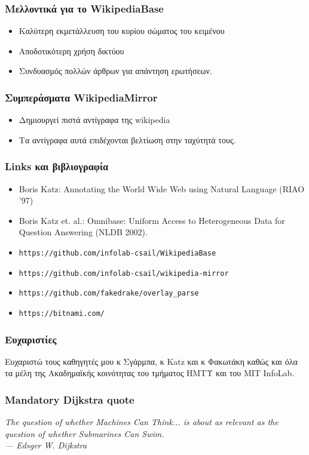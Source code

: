 \documentclass[bigger]{beamer}
\begin{document}
\begin{frame}
  \frametitle{Μελλοντικά για το WikipediaBase}
  \begin{itemize}
  \item Καλύτερη εκμετάλλευση του κυρίου σώματος του κειμένου
  \item Αποδοτικότερη χρήση δικτύου
  \item Συνδυασμός πολλών άρθρων για απάντηση ερωτήσεων.
  \end{itemize}
\end{frame}

\begin{frame}
  \frametitle{Συμπεράσματα WikipediaMirror}

  \begin{itemize}
  \item Δημιουργεί πιστά αντίγραφα της wikipedia
  \item Τα αντίγραφα αυτά επιδέχονται βελτίωση στην ταχύτητά τους.
  \end{itemize}
\end{frame}

\begin{frame}
  \frametitle{Links και βιβλιογραφία}
  \begin{itemize}
  \item Boris Katz: Annotating the World Wide Web using Natural Language (RIAO ’97)
  \item Boris Katz et. al.: Omnibase: Uniform Access to Heterogeneous
    Data for Question Answering (NLDB 2002).
  \item \texttt{https://github.com/infolab-csail/WikipediaBase}
  \item \texttt{https://github.com/infolab-csail/wikipedia-mirror}
  \item \texttt{https://github.com/fakedrake/overlay\_parse}
  \item \texttt{https://bitnami.com/}
  \end{itemize}
\end{frame}

\begin{frame}
  \frametitle{Ευχαριστίες}

  Ευχαριστώ τους καθηγητές μου κ Σγάρμπα, κ Katz και κ Φακωτάκη καθώς
  και όλα τα μέλη της Ακαδημαϊκής κοινότητας του τμήματος ΗΜΤΥ και του
  MIT InfoLab.

\end{frame}

\begin{frame}
  \frametitle{Mandatory Dijkstra quote}

  \vfill
  \textit{The question of whether Machines Can Think... is about as relevant as the question of whether Submarines Can Swim.\\
  \hfill --- Edsger W. Dijkstra}
  \vfill

\end{frame}
\end{document}
